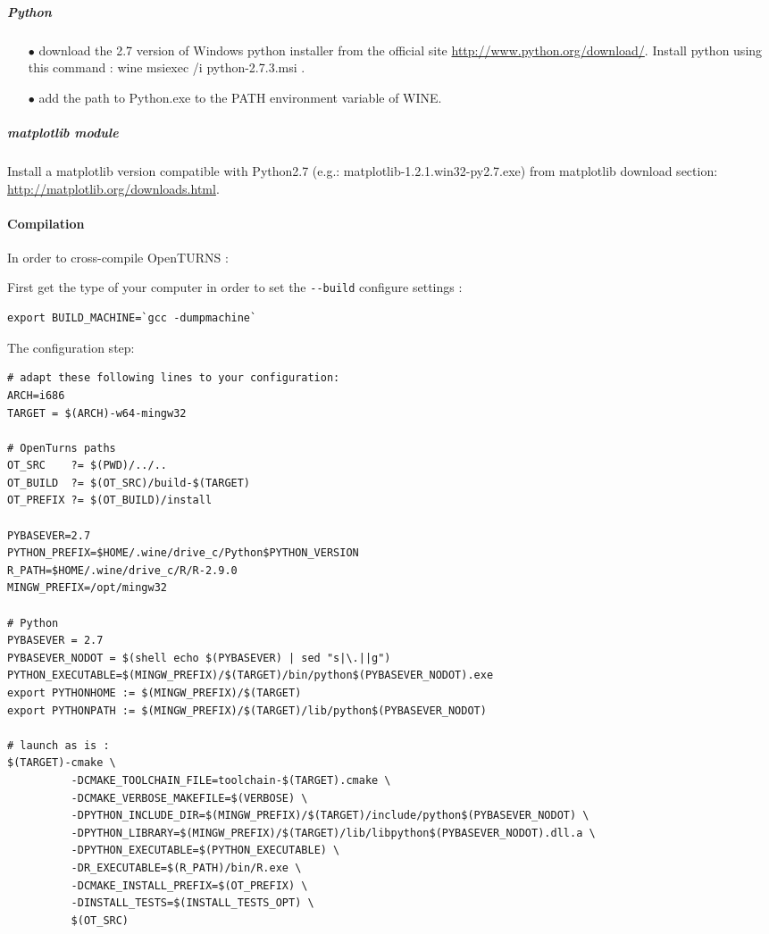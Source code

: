 \subparagraph{Python}

\begin{itemize}
\item[$\bullet$]  download the 2.7 version of Windows python installer from the official site \url{http://www.python.org/download/}. Install python using this command : wine msiexec /i python-2.7.3.msi .
\item[$\bullet$]  add the path to Python.exe to the PATH environment variable of WINE.
\end{itemize}

\subparagraph{matplotlib module}

Install a matplotlib version compatible with Python2.7 (e.g.: matplotlib-1.2.1.win32-py2.7.exe) from matplotlib download section: \url{http://matplotlib.org/downloads.html}.

\paragraph{Compilation}

In order to cross-compile OpenTURNS :

First get the type of your computer in order to set the \verb|--build| configure settings :
\begin{verbatim}
export BUILD_MACHINE=`gcc -dumpmachine`
\end{verbatim}

The configuration step:
\begin{verbatim}
# adapt these following lines to your configuration:
ARCH=i686
TARGET = $(ARCH)-w64-mingw32

# OpenTurns paths
OT_SRC    ?= $(PWD)/../..
OT_BUILD  ?= $(OT_SRC)/build-$(TARGET)
OT_PREFIX ?= $(OT_BUILD)/install

PYBASEVER=2.7
PYTHON_PREFIX=$HOME/.wine/drive_c/Python$PYTHON_VERSION
R_PATH=$HOME/.wine/drive_c/R/R-2.9.0
MINGW_PREFIX=/opt/mingw32

# Python
PYBASEVER = 2.7
PYBASEVER_NODOT = $(shell echo $(PYBASEVER) | sed "s|\.||g")
PYTHON_EXECUTABLE=$(MINGW_PREFIX)/$(TARGET)/bin/python$(PYBASEVER_NODOT).exe
export PYTHONHOME := $(MINGW_PREFIX)/$(TARGET)
export PYTHONPATH := $(MINGW_PREFIX)/$(TARGET)/lib/python$(PYBASEVER_NODOT)

# launch as is :
$(TARGET)-cmake \
          -DCMAKE_TOOLCHAIN_FILE=toolchain-$(TARGET).cmake \
          -DCMAKE_VERBOSE_MAKEFILE=$(VERBOSE) \
          -DPYTHON_INCLUDE_DIR=$(MINGW_PREFIX)/$(TARGET)/include/python$(PYBASEVER_NODOT) \
          -DPYTHON_LIBRARY=$(MINGW_PREFIX)/$(TARGET)/lib/libpython$(PYBASEVER_NODOT).dll.a \
          -DPYTHON_EXECUTABLE=$(PYTHON_EXECUTABLE) \
          -DR_EXECUTABLE=$(R_PATH)/bin/R.exe \
          -DCMAKE_INSTALL_PREFIX=$(OT_PREFIX) \
          -DINSTALL_TESTS=$(INSTALL_TESTS_OPT) \
          $(OT_SRC)

\end{verbatim}

